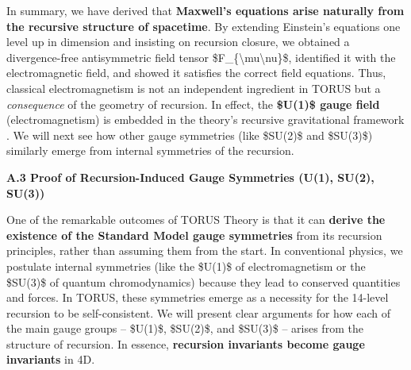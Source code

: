 In summary, we have derived that \textbf{Maxwell's equations arise
naturally from the recursive structure of spacetime}. By extending
Einstein's equations one level up in dimension and insisting on
recursion closure, we obtained a divergence-free antisymmetric field
tensor \$F\_\{\textbackslash{}mu\textbackslash{}nu\}\$, identified it
with the electromagnetic field, and showed it satisfies the correct
field equations​. Thus, classical electromagnetism is not an independent
ingredient in TORUS but a \emph{consequence} of the geometry of
recursion. In effect, the \textbf{\$U(1)\$ gauge field}
(electromagnetism) is embedded in the theory's recursive gravitational
framework​. We will next see how other gauge symmetries (like \$SU(2)\$
and \$SU(3)\$) similarly emerge from internal symmetries of the
recursion.

\textbf{A.3 Proof of Recursion-Induced Gauge Symmetries (U(1), SU(2),
SU(3))}

One of the remarkable outcomes of TORUS Theory is that it can
\textbf{derive the existence of the Standard Model gauge symmetries}
from its recursion principles, rather than assuming them from the start.
In conventional physics, we postulate internal symmetries (like the
\$U(1)\$ of electromagnetism or the \$SU(3)\$ of quantum chromodynamics)
because they lead to conserved quantities and forces. In TORUS, these
symmetries emerge as a necessity for the 14-level recursion to be
self-consistent​. We will present clear arguments for how each of the
main gauge groups -- \$U(1)\$, \$SU(2)\$, and \$SU(3)\$ -- arises from
the structure of recursion. In essence, \textbf{recursion invariants
become gauge invariants} in 4D.

